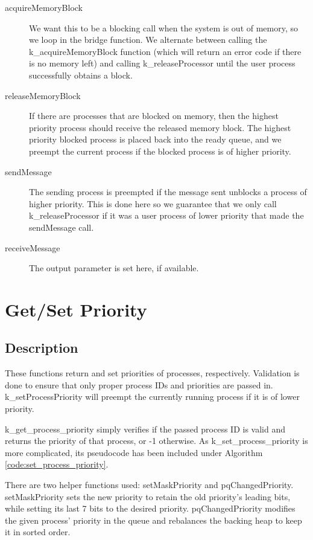\documentclass[12pt]{report}
\begin{document}
    \begin{description}
        \item [acquireMemoryBlock] We want this to be a blocking call when
            the system is out of memory, so we loop in the bridge function.  We
            alternate between calling the k\_acquireMemoryBlock function (which
            will return an error code if there is no memory left) and calling
            k\_releaseProcessor until the user process successfully obtains a
            block.
        \item [releaseMemoryBlock] If there are processes that are blocked on
            memory, then the highest priority process should receive the
            released memory block.  The highest priority blocked process is
            placed back into the ready queue, and we preempt the current process
            if the blocked process is of higher priority.
        \item [sendMessage] The sending process is preempted if the message sent
            unblocks a process of higher priority.  This is done here so we
            guarantee that we only call k\_releaseProcessor if it was a user
            process of lower priority that made the sendMessage call.
        \item [receiveMessage] The output parameter is set here, if available.
    \end{description}

\section{Get/Set Priority}

\subsection{Description}
    These functions return and set priorities of processes, respectively.
    Validation is done to ensure that only proper process IDs and priorities are
    passed in.  k\_setProcessPriority will preempt the currently running process
    if it is of lower priority.

    k\_get\_process\_priority simply verifies if the passed process ID is valid
    and returns the priority of that process, or -1 otherwise.  As
    k\_set\_process\_priority is more complicated, its pseudocode has been
    included under Algorithm \ref{code:set_process_priority}.

    There are two helper functions used: setMaskPriority and pqChangedPriority.
    setMaskPriority sets the new priority to retain the old priority's leading
    bits, while setting its last 7 bits to the desired priority.
    pqChangedPriority modifies the given process' priority in the queue and
    rebalances the backing heap to keep it in sorted order.
\end{document}
